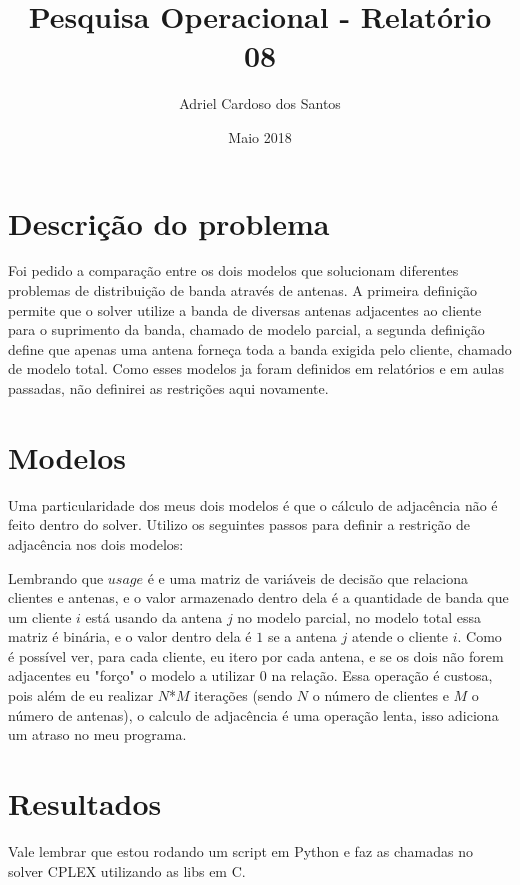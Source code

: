 \documentclass{article}
\title{Pesquisa Operacional - Relatório 08}
\author{Adriel Cardoso dos Santos}
\date{Maio 2018}
\begin{document}
    \maketitle

    \section{Descrição do problema}

    Foi pedido a comparação entre os dois modelos que solucionam diferentes problemas de distribuição de banda através de antenas.
    A primeira definição permite que o solver utilize a banda de diversas antenas adjacentes ao cliente para o suprimento da banda, chamado de
    modelo parcial,
    a segunda definição define que apenas uma antena forneça toda a banda exigida pelo cliente, chamado de modelo total.
    Como esses modelos ja foram definidos em relatórios e em aulas passadas, não definirei as restrições aqui novamente.

    \section{Modelos}

    Uma particularidade dos meus dois modelos é que o cálculo de adjacência não é feito dentro do solver.
    Utilizo os seguintes passos para definir a restrição de adjacência nos dois modelos:

    \begin{algorithm}[H]
        \EndFor
    \end{algorithm}

    Lembrando que $usage$ é e uma matriz de variáveis de decisão que relaciona clientes e antenas, e o valor armazenado dentro dela é a quantidade de banda que um cliente
    $i$ está usando da antena $j$ no modelo parcial, no modelo total essa matriz é binária, e o valor dentro dela é $1$ se a antena $j$ atende o cliente $i$.
    Como é possível ver, para cada cliente, eu itero por cada antena, e se os dois não forem adjacentes eu "forço" o modelo a utilizar 0 na relação.
    Essa operação é custosa, pois além de eu realizar $N$*$M$ iterações (sendo $N$ o número de clientes e $M$ o número de antenas), o calculo de
    adjacência é uma operação lenta, isso adiciona um atraso no meu programa.


    \section{Resultados}
    Vale lembrar que estou rodando um script em Python e faz as chamadas no solver CPLEX utilizando as libs em C.
\end{document}
